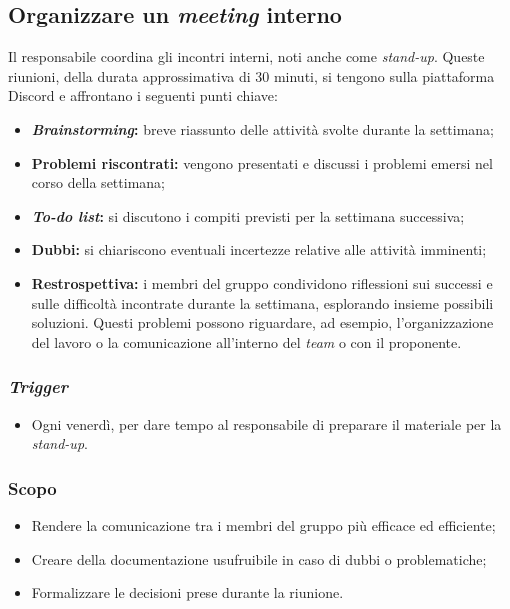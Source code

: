 \subsection{Organizzare un \textit{meeting} interno}
\label{organizzare-meeting-interno}

Il responsabile coordina gli incontri interni, noti anche come \textit{stand-up}.
Queste riunioni, della durata approssimativa di 30 minuti, si tengono sulla piattaforma Discord e affrontano i seguenti punti chiave:
\begin{itemize}
	\item \textbf{\textit{Brainstorming}:} breve riassunto delle attività svolte durante la settimana;
	\item \textbf{Problemi riscontrati:} vengono presentati e discussi i problemi emersi nel corso della settimana;
	\item \textbf{\textit{To-do list}:} si discutono i compiti previsti per la settimana successiva;
	\item \textbf{Dubbi:} si chiariscono eventuali incertezze relative alle attività imminenti;
	\item \textbf{Restrospettiva:} i membri del gruppo condividono riflessioni sui successi e sulle difficoltà incontrate durante la settimana, esplorando insieme possibili soluzioni.
	      Questi problemi possono riguardare, ad esempio, l'organizzazione del lavoro o la comunicazione all'interno del \textit{team} o con il proponente.
\end{itemize}

\subsubsection{\textit{Trigger}}
\begin{itemize}
	\item Ogni venerdì, per dare tempo al responsabile di preparare il materiale
	      per la \textit{stand-up}.
\end{itemize}

\subsubsection{Scopo}
\begin{itemize}
	\item Rendere la comunicazione tra i membri del gruppo più efficace ed
	      efficiente;

	\item Creare della documentazione usufruibile in caso di dubbi o
	      problematiche;

	\item Formalizzare le decisioni prese durante la riunione.
\end{itemize}

